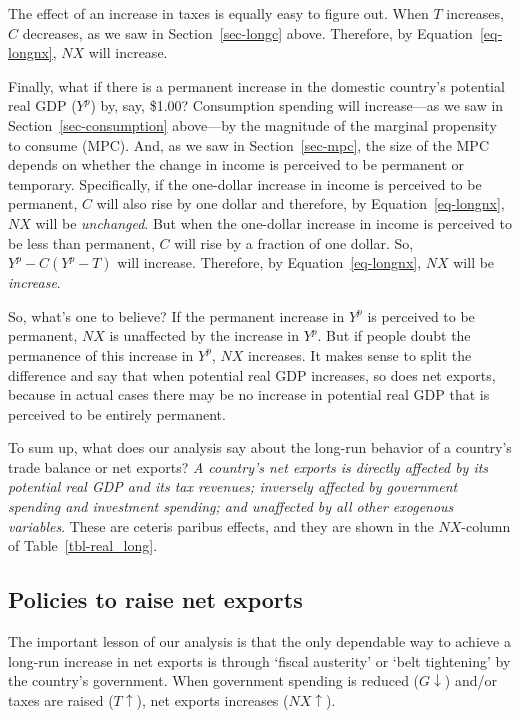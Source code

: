 \documentclass[
  letterpaper,
]{book}
\theoremstyle{plain}
\theoremstyle{remark}
\begin{document}
The effect of an increase in taxes is equally easy to figure out. When
\(T\) increases, \(C\) decreases, as we saw in Section~\ref{sec-longc}
above. Therefore, by Equation~\ref{eq-longnx}, \(NX\) will increase.

Finally, what if there is a permanent increase in the domestic country's
potential real GDP (\(Y^p\)) by, say, \$1.00? Consumption spending will
increase---as we saw in Section~\ref{sec-consumption} above---by the
magnitude of the marginal propensity to consume (MPC). And, as we saw in
Section~\ref{sec-mpc}, the size of the MPC depends on whether the change
in income is perceived to be permanent or temporary. Specifically, if
the one-dollar increase in income is perceived to be permanent, \(C\)
will also rise by one dollar and therefore, by Equation~\ref{eq-longnx},
\(NX\) will be \emph{unchanged}. But when the one-dollar increase in
income is perceived to be less than permanent, \(C\) will rise by a
fraction of one dollar. So, \(Y^p-C(Y^p-T)\) will increase. Therefore,
by Equation~\ref{eq-longnx}, \(NX\) will be \emph{increase}.

So, what's one to believe? If the permanent increase in \(Y^p\) is
perceived to be permanent, \(NX\) is unaffected by the increase in
\(Y^p\). But if people doubt the permanence of this increase in \(Y^p\),
\(NX\) increases. It makes sense to split the difference and say that
when potential real GDP increases, so does net exports, because in
actual cases there may be no increase in potential real GDP that is
perceived to be entirely permanent.

To sum up, what does our analysis say about the long-run behavior of a
country's trade balance or net exports? \emph{A country's net exports is
directly affected by its potential real GDP and its tax revenues;
inversely affected by government spending and investment spending; and
unaffected by all other exogenous variables}. These are ceteris paribus
effects, and they are shown in the \(NX\)-column of
Table~\ref{tbl-real_long}.

\subsection{Policies to raise net exports}\label{sec-boost-nx}

The important lesson of our analysis is that the only dependable way to
achieve a long-run increase in net exports is through `fiscal austerity'
or `belt tightening' by the country's government. When government
spending is reduced (\(G\downarrow\)) and/or taxes are raised
(\(T\uparrow\)), net exports increases (\(NX\uparrow\)).
\end{document}
